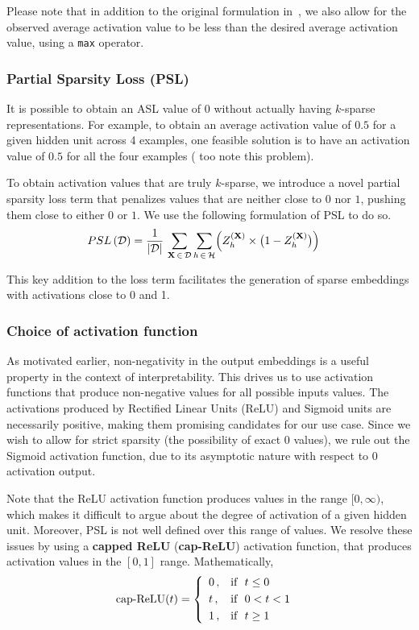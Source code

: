 \documentclass[letterpaper]{article} %
\begin{document}
Please note that in addition to the original formulation in~\cite{ng2011sparse}, we also allow for the observed average activation value to be less than the desired average activation value, using a \texttt{max} operator.


\subsubsection{Partial Sparsity Loss (PSL)}
It is possible to obtain an ASL value of $0$ without actually having $k$-sparse representations. For example, to obtain an average activation value of $0.5$ for a given hidden unit across 4 examples, one feasible solution is to have an activation value of $0.5$ for all the four examples (\cite{makhzani2013k} too note this problem).

  To obtain activation values that are truly $k$-sparse, we introduce a novel partial sparsity loss term that penalizes values that are neither close to $0$ nor $1$, pushing them close to either $0$ or $1$. We use the following formulation of PSL to do so.
 \begin{align*}
   PSL\,(\mathcal{D}) &= \frac{1}{|\mathcal{D}|} \,\sum_{\mathbf{X} \,\in \,\mathcal{D}} \sum_{h \,\in \,\mathcal{H}} \Bigl( Z_h^{(\mathbf{X})} \times \bigl(1-Z_h^{(\mathbf{X})}\bigr)\Bigr)
 \end{align*}

 This key addition to the loss term facilitates the generation of sparse embeddings with activations close to 0 and 1.
  
\smallskip
\subsubsection{Choice of activation function}
As motivated earlier, non-negativity in the output embeddings is a useful property in the context of interpretability. This drives us to use activation functions that produce non-negative values for all possible inputs values. The activations produced by Rectified Linear Units (ReLU) and Sigmoid units are necessarily positive, making them promising candidates for our use case. Since we wish to allow for strict sparsity (the possibility of exact $0$ values), we rule out the Sigmoid activation function, due to its asymptotic nature with respect to $0$ activation output.

Note that the ReLU activation function produces values in the range $[0,\infty)$, which makes it difficult to argue about the degree of activation of a given hidden unit. Moreover, PSL is not well defined over this range of values. We resolve these issues by using a \textbf{capped ReLU} (\textbf{cap-ReLU}) activation function, that produces activation values in the $[0,1]$ range. Mathematically,
    \begin{align*}
      \text{cap-ReLU}(t) &=
    \begin{dcases}
      \,~0\,, & \text{if }~t\leq 0\\
      \,~t\,, & \text{if }~ 0 < t < 1\\
      \,~1\,, & \text{if }~t\geq 1\\
    \end{dcases}
    \end{align*}
\end{document}
